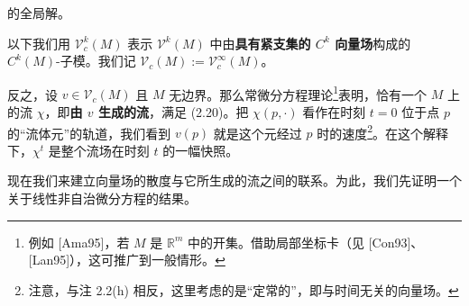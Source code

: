 的全局解。

以下我们用 $ \mathcal{V}_c^k(M) $ 表示 $ \mathcal{V}^k(M) $ 中由\textbf{具有紧支集的 $ C^k $ 向量场}构成的 $ C^k(M) $-子模。我们记 $ \mathcal{V}_c(M) := \mathcal{V}_c^\infty(M) $。

反之，设 $ v \in \mathcal{V}_c(M) $ 且 $ M $ 无边界。那么常微分方程理论\footnote{例如 [Ama95]，若 $ M $ 是 $ \mathbb{R}^m $ 中的开集。借助局部坐标卡（见 [Con93]、[Lan95]），这可推广到一般情形。}表明，恰有一个 $ M $ 上的流 $ \chi $，即\textbf{由 $ v $ 生成的流}，满足 (2.20)。把 $ \chi(p,\cdot) $ 看作在时刻 $ t = 0 $ 位于点 $ p $ 的“流体元”的轨道，我们看到 $ v(p) $ 就是这个元经过 $ p $ 时的速度\footnote{注意，与注 2.2(h) 相反，这里考虑的是“定常的”，即与时间无关的向量场。}。在这个解释下，$ \chi^t $ 是整个流场在时刻 $ t $ 的一幅快照。

现在我们来建立向量场的散度与它所生成的流之间的联系。为此，我们先证明一个关于线性非自治微分方程的结果。

